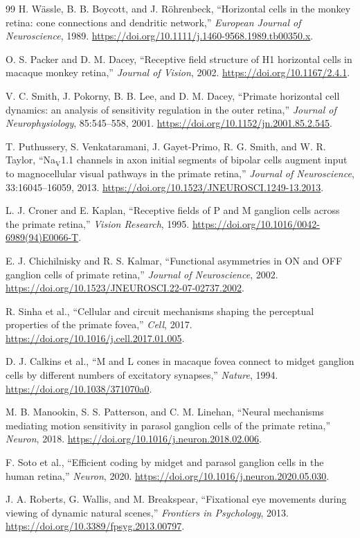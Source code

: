 \documentclass[uplatex,dvipdfmx,a4paper,10pt]{jsarticle}
\begin{document}
\begin{thebibliography}{99}
H. W\"assle, B. B. Boycott, and J. R\"ohrenbeck,
``Horizontal cells in the monkey retina: cone connections and dendritic network,''
\textit{European Journal of Neuroscience}, 1989.
\url{https://doi.org/10.1111/j.1460-9568.1989.tb00350.x}.

O. S. Packer and D. M. Dacey,
``Receptive field structure of H1 horizontal cells in macaque monkey retina,''
\textit{Journal of Vision}, 2002.
\url{https://doi.org/10.1167/2.4.1}.

V. C. Smith, J. Pokorny, B. B. Lee, and D. M. Dacey,
``Primate horizontal cell dynamics: an analysis of sensitivity regulation in the outer retina,''
\textit{Journal of Neurophysiology}, 85:545--558, 2001.
\url{https://doi.org/10.1152/jn.2001.85.2.545}.

T. Puthussery, S. Venkataramani, J. Gayet-Primo, R. G. Smith, and W. R. Taylor,
``Na$_\mathrm{V}$1.1 channels in axon initial segments of bipolar cells augment input to magnocellular visual pathways in the primate retina,''
\textit{Journal of Neuroscience}, 33:16045--16059, 2013.
\url{https://doi.org/10.1523/JNEUROSCI.1249-13.2013}.

L. J. Croner and E. Kaplan,
``Receptive fields of P and M ganglion cells across the primate retina,''
\textit{Vision Research}, 1995.
\url{https://doi.org/10.1016/0042-6989(94)E0066-T}.

E. J. Chichilnisky and R. S. Kalmar,
``Functional asymmetries in ON and OFF ganglion cells of primate retina,''
\textit{Journal of Neuroscience}, 2002.
\url{https://doi.org/10.1523/JNEUROSCI.22-07-02737.2002}.

R. Sinha et al.,
``Cellular and circuit mechanisms shaping the perceptual properties of the primate fovea,''
\textit{Cell}, 2017.
\url{https://doi.org/10.1016/j.cell.2017.01.005}.

D. J. Calkins et al.,
``M and L cones in macaque fovea connect to midget ganglion cells by different numbers of excitatory synapses,''
\textit{Nature}, 1994.
\url{https://doi.org/10.1038/371070a0}.

M. B. Manookin, S. S. Patterson, and C. M. Linehan,
``Neural mechanisms mediating motion sensitivity in parasol ganglion cells of the primate retina,''
\textit{Neuron}, 2018.
\url{https://doi.org/10.1016/j.neuron.2018.02.006}.

F. Soto et al.,
``Efficient coding by midget and parasol ganglion cells in the human retina,''
\textit{Neuron}, 2020.
\url{https://doi.org/10.1016/j.neuron.2020.05.030}.

J. A. Roberts, G. Wallis, and M. Breakspear,
``Fixational eye movements during viewing of dynamic natural scenes,''
\textit{Frontiers in Psychology}, 2013.
\url{https://doi.org/10.3389/fpsyg.2013.00797}.

\end{thebibliography}
\end{document}
